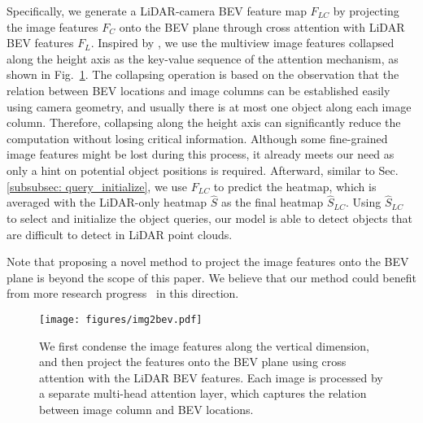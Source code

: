 Specifically, we generate a LiDAR-camera BEV feature map $F_{LC}$ by projecting the image features $F_{C}$ onto {the} BEV plane through cross attention with LiDAR BEV features $F_{L}$.
Inspired by \cite{Roddick2020PredictingSM}, we use the multiview image features collapsed {a}long the height axis as {the key-value sequence of the attention mechanism,} 
as shown in Fig.~\ref{fig:img2bev}. The  {collapsing} operation is based on the observation that the relation between BEV locations and image columns can be established easily using camera geometry, and usually there is at most one object along each image column. Therefore, collapsing {along} the height axis {can} significantly reduce the computation without losing critical information. Although some fine-grained image features might be lost during this process, it already 
{meets} our need 
{as only a hint on potential object positions is required.} Afterward, similar {to} Sec. \ref{subsubsec: query_initialize}, we use $F_{LC}$ to predict the heatmap{, which is} averaged with the LiDAR-only heatmap $\hat S$ as the final heatmap $\hat S_{LC}$. Using $\hat S_{LC}$ to select and initialize the object queries, our model is able to detect objects that are difficult to detect in {LiDAR point clouds.}


Note that proposing a novel method to project the image features onto the BEV plane is beyond the scope of this paper{. We} believe that our method could benefit from more research progress~\cite{Roddick2019OrthographicFT, Roddick2020PredictingSM, Philion2020LiftSS} 
{in} this direction.

\begin{figure}[t]
	\vspace{-0.5cm}
	\setlength{\abovecaptionskip}{0.0cm}
	 \setlength{\belowcaptionskip}{-0.45cm}
	\center
    \texttt{[image: figures/img2bev.pdf]}
    \caption{We first condense the image features along the vertical dimension, {and} then project the features onto {the} BEV plane using cross attention with the LiDAR BEV features. Each image is process{ed} by a separate multi-head attention layer{,} which captures the relation between image column and BEV locations.}
    \label{fig:img2bev}
\end{figure}


\xy{
}







